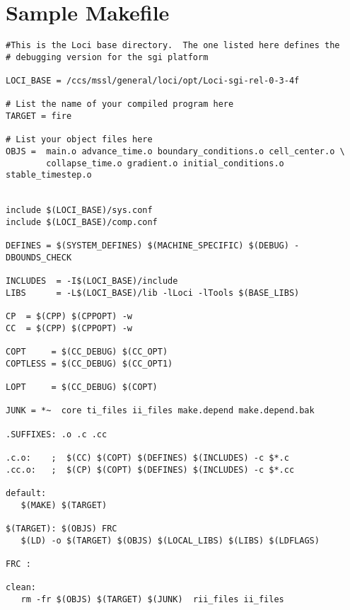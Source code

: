 \section { Sample Makefile }

\begin{verbatim}
#This is the Loci base directory.  The one listed here defines the
# debugging version for the sgi platform

LOCI_BASE = /ccs/mssl/general/loci/opt/Loci-sgi-rel-0-3-4f

# List the name of your compiled program here
TARGET = fire

# List your object files here
OBJS =  main.o advance_time.o boundary_conditions.o cell_center.o \
        collapse_time.o gradient.o initial_conditions.o stable_timestep.o


include $(LOCI_BASE)/sys.conf
include $(LOCI_BASE)/comp.conf

DEFINES = $(SYSTEM_DEFINES) $(MACHINE_SPECIFIC) $(DEBUG) -DBOUNDS_CHECK

INCLUDES  = -I$(LOCI_BASE)/include
LIBS      = -L$(LOCI_BASE)/lib -lLoci -lTools $(BASE_LIBS)

CP  = $(CPP) $(CPPOPT) -w
CC  = $(CPP) $(CPPOPT) -w

COPT     = $(CC_DEBUG) $(CC_OPT)
COPTLESS = $(CC_DEBUG) $(CC_OPT1)

LOPT     = $(CC_DEBUG) $(COPT)

JUNK = *~  core ti_files ii_files make.depend make.depend.bak

.SUFFIXES: .o .c .cc

.c.o:    ;  $(CC) $(COPT) $(DEFINES) $(INCLUDES) -c $*.c
.cc.o:   ;  $(CP) $(COPT) $(DEFINES) $(INCLUDES) -c $*.cc

default:
   $(MAKE) $(TARGET)

$(TARGET): $(OBJS) FRC
   $(LD) -o $(TARGET) $(OBJS) $(LOCAL_LIBS) $(LIBS) $(LDFLAGS)

FRC :

clean:
   rm -fr $(OBJS) $(TARGET) $(JUNK)  rii_files ii_files

\end{verbatim}

~

